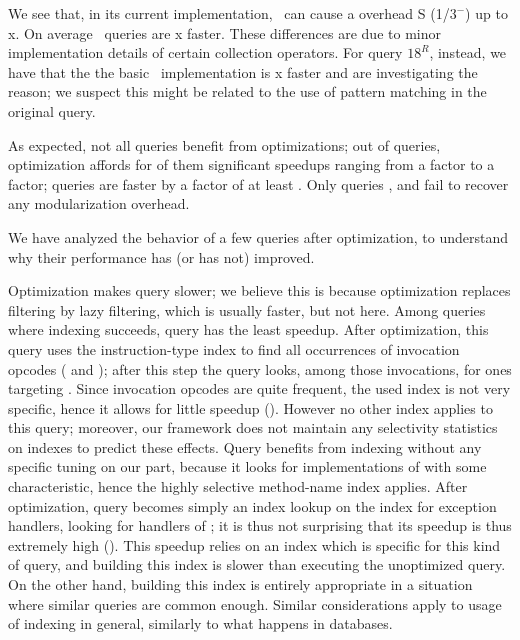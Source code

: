We see that, in its current implementation, \LoS\ can cause a overhead S
(1/$3^-$) up to \maxInterpOver{}x. On average \LoS\ queries are
\geoMeanInterpOver{}x faster. These differences are due to minor implementation
details of certain collection operators.
For query $18^R$, instead, we have that the the basic \LoS\ implementation is \maxInvInterpOver{}x faster and are investigating the reason; we suspect this might be related to the use of pattern matching in the original query.

As expected, not all queries benefit from optimizations;
out of \queryCount{} queries, optimization affords for \nSpeededUpQueries{} of them significant speedups ranging from a \minOptimSpeedup{} factor to a \maxOptimSpeedup{} factor; \nBigSpeededUpQueries{} queries are faster by a factor of at least \speedupBigThreshold{}.
Only queries \queryMSPKGPROTECT{}, \querySICINNERSHOULDBESTATICANON{} and \queryITAINEFFICIENTTOARRAY{} fail to recover any modularization overhead.

We have analyzed the behavior of a few queries after optimization, to understand why their performance has
(or has not) improved.

Optimization makes query \querySEBADFIELDINNERCLASS{} slower; we believe this is because optimization replaces filtering by lazy filtering, which is usually faster, but not here.
Among queries where indexing succeeds, query \queryGCCALL{} has the least speedup. After optimization, this query uses the instruction-type index to find all occurrences of invocation opcodes ( and ); after this step the query looks, among those invocations, for ones targeting . Since invocation opcodes are quite frequent, the used index is not very specific, hence it allows for little speedup (\speedupTGCCALL). However no other index applies to this query; moreover, our framework does not maintain any selectivity statistics on indexes to predict these effects.
Query \queryFIUSELESS{} benefits from indexing without any specific tuning on our part, because it looks for implementations of  with some characteristic, hence the highly selective method-name index applies.
After optimization, query \queryDONTCATCHIMSE{} becomes simply an index lookup on the index for exception handlers, looking for handlers of ; it is thus not surprising that its speedup is thus extremely high (\maxOptimSpeedup{}). This speedup relies on an index which is specific for this kind of query, and building this index is slower than executing the unoptimized query. On the other hand, building this index is entirely appropriate in a situation where similar queries are common enough. Similar considerations apply to usage of indexing in general, similarly to what happens in databases.

